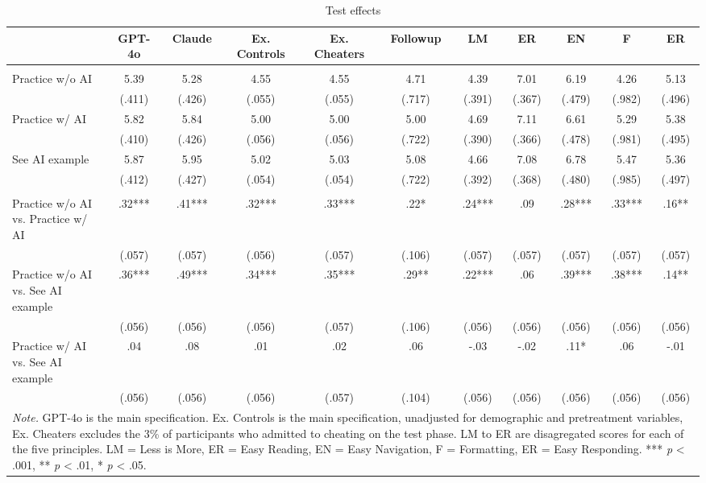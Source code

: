 \documentclass[11pt]{report}
\begin{document}
\begin{append}
\begin{table}[ht]
    \centering
        \caption{Test effects}

\begin{tabular}{lcccccccccc}
\toprule
  & GPT-4o & Claude & Ex. Controls & Ex. Cheaters & Followup & LM & ER & EN & F & ER \\ 
\midrule\addlinespace[2.5pt]
\multicolumn{11}{l}{\textbf{Means --- (SE)}} \\ 
\midrule\addlinespace[2.5pt]
Practice w/o AI & 5.39 & 5.28 & 4.55 & 4.55 & 4.71 & 4.39 & 7.01 & 6.19 & 4.26 & 5.13 \\ 
 & (.411) & (.426) & (.055) & (.055) & (.717) & (.391) & (.367) & (.479) & (.982) & (.496) \\ 
Practice w/ AI & 5.82 & 5.84 & 5.00 & 5.00 & 5.00 & 4.69 & 7.11 & 6.61 & 5.29 & 5.38 \\ 
 & (.410) & (.426) & (.056) & (.056) & (.722) & (.390) & (.366) & (.478) & (.981) & (.495) \\ 
See AI example & 5.87 & 5.95 & 5.02 & 5.03 & 5.08 & 4.66 & 7.08 & 6.78 & 5.47 & 5.36 \\ 
 & (.412) & (.427) & (.054) & (.054) & (.722) & (.392) & (.368) & (.480) & (.985) & (.497) \\ 
\midrule\addlinespace[2.5pt]
\multicolumn{11}{l}{\textbf{Effect Sizes (d) --- (SE)}} \\ 
\midrule\addlinespace[2.5pt]
Practice w/o AI vs. Practice w/ AI & .32*** & .41*** & .32*** & .33*** & .22* & .24*** & .09 & .28*** & .33*** & .16** \\ 
 & (.057) & (.057) & (.056) & (.057) & (.106) & (.057) & (.057) & (.057) & (.057) & (.057) \\ 
Practice w/o AI vs. See AI example & .36*** & .49*** & .34*** & .35*** & .29** & .22*** & .06 & .39*** & .38*** & .14** \\ 
 & (.056) & (.056) & (.056) & (.057) & (.106) & (.056) & (.056) & (.056) & (.056) & (.056) \\ 
Practice w/ AI vs. See AI example & .04 & .08 & .01 & .02 & .06 & -.03 & -.02 & .11* & .06 & -.01 \\ 
 & (.056) & (.056) & (.056) & (.057) & (.104) & (.056) & (.056) & (.056) & (.056) & (.056) \\ 
\midrule
\multicolumn{11}{p{18cm}}{\textit{Note.} GPT-4o is the main specification. Ex. Controls is the main specification, unadjusted for demographic and pretreatment variables, Ex. Cheaters excludes the 3\% of participants who admitted to cheating on the test phase. LM to ER are disagregated scores for each of the five principles. LM = Less is More, ER = Easy Reading, EN = Easy Navigation, F = Formatting, ER = Easy Responding. *** \textit{p} < .001, ** \textit{p} < .01, * \textit{p} < .05.}
\vspace{5pt}\end{tabular}


\end{table}
\end{append}
\end{document}
